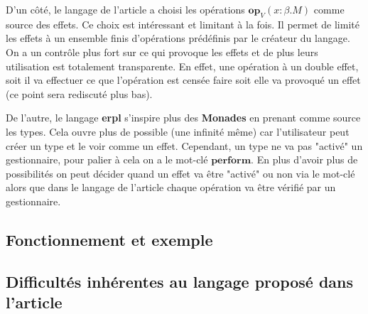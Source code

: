 D'un côté, le langage de l'article a choisi les opérations $\textbf{op}_V(x:\beta.M)$ comme source des effets.
Ce choix est intéressant et limitant à la fois. Il permet de limité les effets à un ensemble finis d'opérations
prédéfinis par le créateur du langage. On a un contrôle plus fort sur ce qui provoque les effets et de plus leurs
utilisation est totalement transparente. En effet, une opération à un double effet, soit il va effectuer ce que l'opération
est censée faire soit elle va provoqué un effet (ce point sera rediscuté plus bas).

De l'autre, le langage \textbf{erpl} s'inspire plus des \textbf{Monades} en prenant comme source les types. Cela ouvre
plus de possible (une infinité même) car l'utilisateur peut créer un type et le voir comme un effet. Cependant, un type ne va
pas "activé" un gestionnaire, pour palier à cela on a le mot-clé $\textbf{perform}$. En plus d'avoir plus de possibilités
on peut décider quand un effet va être "activé" ou non via le mot-clé alors que dans le langage de l'article chaque opération 
va être vérifié par un gestionnaire. 

\subsection{Fonctionnement et exemple}

\subsection{Difficultés inhérentes au langage proposé dans l'article}